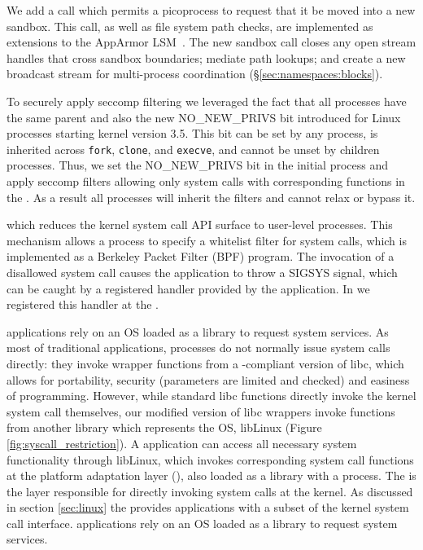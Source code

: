\vspace{5pt}
 We add a \pal{} call which
permits a picoprocess to request that it be moved into a new sandbox.
This call, as well as file system path checks, are implemented
as extensions to the  AppArmor LSM~\citep{apparmor}.
The new sandbox call closes any open stream handles that cross sandbox boundaries;
mediate path lookups;
and create a new broadcast stream for multi-process
 coordination (\S\ref{sec:namespaces:blocks}).

To securely apply seccomp filtering we leveraged the fact that all
\sysname{} processes have the same parent and also the new
NO\_NEW\_PRIVS bit introduced for Linux processes starting kernel
version 3.5. This bit can be set by any process, is inherited across
{\tt fork}, {\tt clone}, and {\tt execve}, and cannot be unset by
children processes. Thus, we set the NO\_NEW\_PRIVS bit in the initial
\sysname{} process and apply seccomp filters allowing only system calls
with corresponding functions in the \pal{}. As a result all \sysname{}
processes will inherit the filters and cannot relax or bypass it.



which reduces the kernel
system call API surface to user-level processes. This mechanism allows
a process to specify a whitelist filter for system calls, which is
implemented as a Berkeley Packet Filter (BPF) program. The invocation
of a disallowed system call causes the application to throw a SIGSYS
signal, which can be caught by a registered handler provided by the
application. In \sysname{} we registered this handler at the \pal{}.


\sysname{} applications rely on an OS loaded as a library to request
system services. As most of traditional applications, \sysname{}
processes do not normally issue system calls directly: they invoke
wrapper functions from a \sysname{}-compliant version of libc, which
allows for portability, security (parameters are limited and checked)
and easiness of programming. However, while standard libc functions
directly invoke the kernel system call themselves, our modified
version of libc wrappers invoke functions from another library which
represents the OS, libLinux (Figure \ref{fig:syscall_restriction}). A
\sysname{} application can access all necessary system functionality
through libLinux, which invokes corresponding system call functions at
the platform adaptation layer (\pal{}), also loaded as a library with a
\sysname{} process. The \pal{} is the layer responsible for directly
invoking system calls at the kernel. As discussed in section
\ref{sec:linux} the \pal{} provides \sysname{} applications with a
subset of the kernel system call interface.\sysname{} applications rely
on an OS loaded as a library to request system services.

